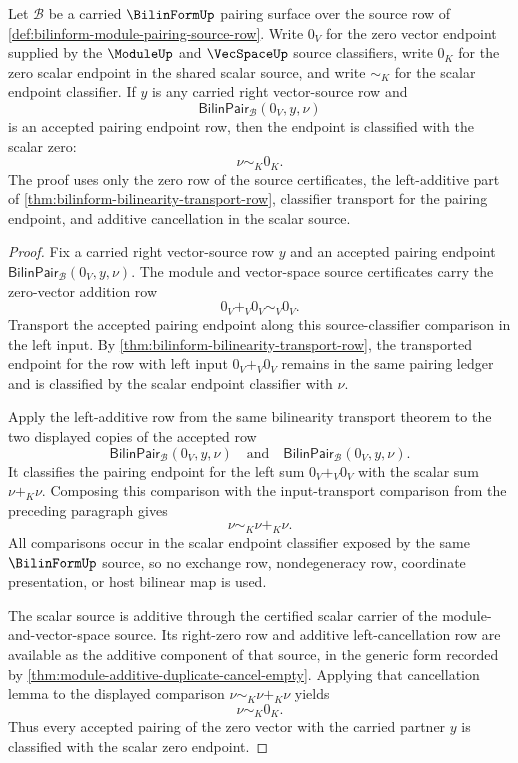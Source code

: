 \begin{theorem}
\label{thm:bilinform-zero-left-pairing-vanishing-row}
Let $\mathcal{B}$ be a carried $\BilinFormUp$ pairing surface over the source row of \autoref{def:bilinform-module-pairing-source-row}. Write $0_V$ for the zero vector endpoint supplied by the $\ModuleUp$ and $\VecSpaceUp$ source classifiers, write $0_K$ for the zero scalar endpoint in the shared scalar source, and write $\sim_K$ for the scalar endpoint classifier. If $y$ is any carried right vector-source row and
$$
\mathsf{BilinPair}_{\mathcal{B}}(0_V,y,\nu)
$$
is an accepted pairing endpoint row, then the endpoint is classified with the scalar zero:
$$
\nu\sim_K0_K.
$$
The proof uses only the zero row of the source certificates, the left-additive part of \autoref{thm:bilinform-bilinearity-transport-row}, classifier transport for the pairing endpoint, and additive cancellation in the scalar source.
\end{theorem}
\begin{proof}
Fix a carried right vector-source row $y$ and an accepted pairing endpoint
$\mathsf{BilinPair}_{\mathcal{B}}(0_V,y,\nu)$. The module and vector-space source certificates carry the zero-vector addition row
$$
0_V+_V0_V\sim_V0_V.
$$
Transport the accepted pairing endpoint along this source-classifier comparison in the left input. By \autoref{thm:bilinform-bilinearity-transport-row}, the transported endpoint for the row with left input $0_V+_V0_V$ remains in the same pairing ledger and is classified by the scalar endpoint classifier with $\nu$.

Apply the left-additive row from the same bilinearity transport theorem to the two displayed copies of the accepted row
$$
\mathsf{BilinPair}_{\mathcal{B}}(0_V,y,\nu)
\quad\text{and}\quad
\mathsf{BilinPair}_{\mathcal{B}}(0_V,y,\nu).
$$
It classifies the pairing endpoint for the left sum $0_V+_V0_V$ with the scalar sum $\nu+_K\nu$. Composing this comparison with the input-transport comparison from the preceding paragraph gives
$$
\nu\sim_K\nu+_K\nu.
$$
All comparisons occur in the scalar endpoint classifier exposed by the same $\BilinFormUp$ source, so no exchange row, nondegeneracy row, coordinate presentation, or host bilinear map is used.

The scalar source is additive through the certified scalar carrier of the module-and-vector-space source. Its right-zero row and additive left-cancellation row are available as the additive component of that source, in the generic form recorded by \autoref{thm:module-additive-duplicate-cancel-empty}. Applying that cancellation lemma to the displayed comparison $\nu\sim_K\nu+_K\nu$ yields
$$
\nu\sim_K0_K.
$$
Thus every accepted pairing of the zero vector with the carried partner $y$ is classified with the scalar zero endpoint.
\end{proof}
